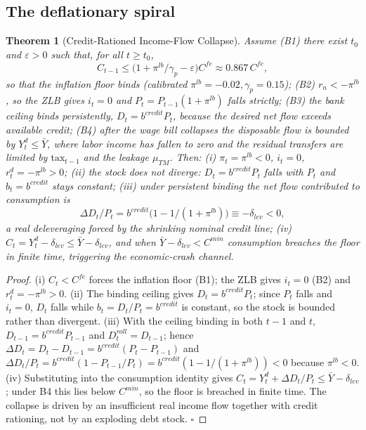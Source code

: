 \documentclass[review,12pt]{elsarticle}
\theoremstyle{plain}
\newtheorem{theorem}{Theorem}
\theoremstyle{definition}
\theoremstyle{remark}
\begin{document}
\subsection{The deflationary spiral}
\begin{theorem}[Credit-Rationed Income-Flow Collapse]
\label{thm2}
Assume (B1) there exist $t_0$ and $\varepsilon>0$ such that, for all $t\ge t_0$,
\[
C_{t-1}\le\big(1+\pi^{lb}/\gamma_p-\varepsilon\big)C^{fe}\approx0.867\,C^{fe},
\]
so that the inflation floor binds (calibrated $\pi^{lb}=-0.02,\gamma_p=0.15$);
(B2) $r_n<-\pi^{lb}$, so the ZLB gives $i_t=0$ and $P_t=P_{t-1}(1+\pi^{lb})$ falls strictly;
(B3) the bank ceiling binds persistently, $D_t=b^{credit}P_t$, because the desired net flow exceeds available credit;
(B4) after the wage bill collapses the disposable flow is bounded by $Y_t^d\le\bar Y$, where labor income has fallen to zero and the residual transfers are limited by $\text{tax}_{t-1}$ and the leakage $\mu_{TM}$. Then:
(i) $\pi_t=\pi^{lb}<0$, $i_t=0$, $r_t^d=-\pi^{lb}>0$;
(ii) the stock does not diverge: $D_t=b^{credit}P_t$ falls with $P_t$ and $b_t=b^{credit}$ stays constant;
(iii) under persistent binding the net flow contributed to consumption is
\[
\Delta D_t/P_t=b^{credit}\big(1-1/(1+\pi^{lb})\big)\equiv-\delta_{lev}<0,
\]
a real deleveraging forced by the shrinking nominal credit line;
(iv) $C_t=Y_t^d-\delta_{lev}\le\bar Y-\delta_{lev}$, and when $\bar Y-\delta_{lev}<C^{min}$ consumption breaches the floor in finite time, triggering the economic-crash channel.
\end{theorem}
\begin{proof}
(i) $C_t<C^{fe}$ forces the inflation floor (B1); the ZLB gives $i_t=0$ (B2) and $r_t^d=-\pi^{lb}>0$.
(ii) The binding ceiling gives $D_t=b^{credit}P_t$; since $P_t$ falls and $i_t=0$, $D_t$ falls while $b_t=D_t/P_t=b^{credit}$ is constant, so the stock is bounded rather than divergent.
(iii) With the ceiling binding in both $t-1$ and $t$, $D_{t-1}=b^{credit}P_{t-1}$ and $D_t^{roll}=D_{t-1}$; hence $\Delta D_t=D_t-D_{t-1}=b^{credit}(P_t-P_{t-1})$ and $\Delta D_t/P_t=b^{credit}(1-P_{t-1}/P_t)=b^{credit}(1-1/(1+\pi^{lb}))<0$ because $\pi^{lb}<0$.
(iv) Substituting into the consumption identity gives $C_t=Y_t^d+\Delta D_t/P_t\le\bar Y-\delta_{lev}$; under B4 this lies below $C^{min}$, so the floor is breached in finite time. The collapse is driven by an insufficient real income flow together with credit rationing, not by an exploding debt stock. $\square$
\end{proof}
\end{document}
